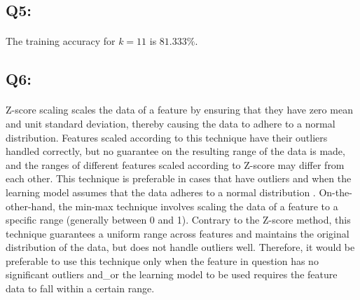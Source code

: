 \documentclass{article}
\begin{document}
\subsection*{Q5:}
    \paragraph*{}
    The training accuracy for $k=11$ is $81.333\%$.

\subsection*{Q6:}
    \paragraph*{}
    Z-score scaling scales the data of a feature by ensuring that they have zero mean and unit standard deviation, thereby causing the data to adhere to a normal distribution. Features scaled according to this technique have their outliers handled correctly, but no guarantee on the resulting range of the data is made, and the ranges of different features scaled according to Z-score may differ from each other. This technique is preferable in cases that have outliers and when the learning model assumes that the data adheres to a normal distribution . On-the-other-hand, the min-max technique involves scaling the data of a feature to a specific range (generally between 0 and 1). Contrary to the Z-score method, this technique guarantees a uniform range across features and maintains the original distribution of the data, but does not handle outliers well. Therefore, it would be preferable to use this technique only when the feature in question has no significant outliers and\_or the learning model to be used requires the feature data to fall within a certain range.
\end{document}
